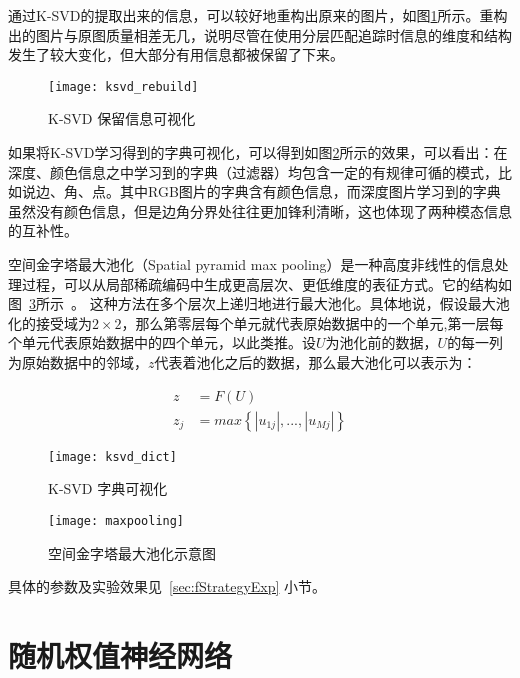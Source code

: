 通过K-SVD的提取出来的信息，可以较好地重构出原来的图片，如图\ref{fig:ksvd_rebuild}所示。重构出的图片与原图质量相差无几，说明尽管在使用分层匹配追踪时信息的维度和结构发生了较大变化，但大部分有用信息都被保留了下来。

\begin{figure}[H] %
  \centering
  \texttt{[image: ksvd\_rebuild]}
  \caption{K-SVD 保留信息可视化}
  \label{fig:ksvd_rebuild}
\end{figure}

如果将K-SVD学习得到的字典可视化，可以得到如图\ref{fig:ksvd_dict}所示的效果，可以看出：在深度、颜色信息之中学习到的字典（过滤器）均包含一定的有规律可循的模式，比如说边、角、点。其中RGB图片的字典含有颜色信息，而深度图片学习到的字典虽然没有颜色信息，但是边角分界处往往更加锋利清晰，这也体现了两种模态信息的互补性。

空间金字塔最大池化（Spatial pyramid max pooling）是一种高度非线性的信息处理过程，可以从局部稀疏编码中生成更高层次、更低维度的表征方式。它的结构如图~\ref{fig:maxpooling}所示~。
这种方法在多个层次上递归地进行最大池化。具体地说，假设最大池化的接受域为$2 \times 2$，那么第零层每个单元就代表原始数据中的一个单元,第一层每个单元代表原始数据中的四个单元，以此类推。设$U$为池化前的数据，$U$的每一列为原始数据中的邻域，$z$代表着池化之后的数据，那么最大池化可以表示为：

\begin{equation}
\begin{aligned}
z &= F(U) \\
z_j &= max\left\{|u_{1j}|, ..., |u_{Mj}|\right\}
\end{aligned}
\end{equation}

\begin{figure}[H] %
  \centering
  \texttt{[image: ksvd\_dict]}
  \caption{K-SVD 字典可视化}
  \label{fig:ksvd_dict}
\end{figure}

\begin{figure}[H] %
  \centering
  \texttt{[image: maxpooling]}
  \caption{空间金字塔最大池化示意图}
  \label{fig:maxpooling}
\end{figure}

具体的参数及实验效果见~\ref{sec:fStrategyExp} 小节。



\section{随机权值神经网络}
\label{sec:CRNN}

